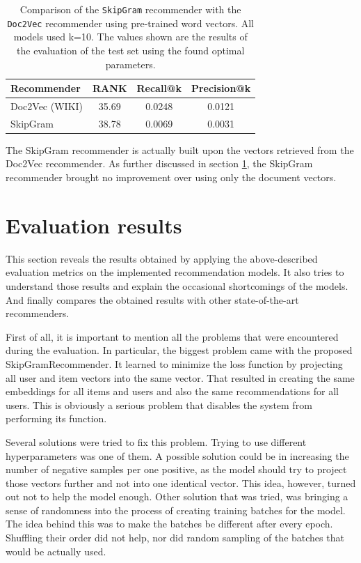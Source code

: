 \begin{table}[H]
    \centering
    \begin{tabular}{| l | c | c | c |}
        \hline
        Recommender & \textbf{RANK} & \textbf{Recall@k} & \textbf{Precision@k} \\ \hline
        Doc2Vec (WIKI)    &   35.69   &   0.0248  &   0.0121    \\ \hline
        SkipGram          & 38.78     &   0.0069  &   0.0031       \\ \hline
    \end{tabular}
    \caption{Comparison of the \texttt{SkipGram} recommender with the \texttt{Doc2Vec} recommender using pre-trained word vectors. All models used k=10. The values shown are the results of the evaluation of the test set using the found optimal parameters.}
    \label{doc2vec_skipgram}
\end{table}
The SkipGram recommender is actually built upon the vectors retrieved from the Doc2Vec recommender. As further discussed in section \ref{eval_results}, the SkipGram recommender brought no improvement over using only the document vectors.

\pagebreak

\section{Evaluation results} \label{eval_results}
This section reveals the results obtained by applying the above-described evaluation metrics on the implemented recommendation models. It also tries to understand those results and explain the occasional shortcomings of the models. And finally compares the obtained results with other state-of-the-art recommenders.

First of all, it is important to mention all the problems that were encountered during the evaluation. In particular, the biggest problem came with the proposed SkipGramRecommender. It learned to minimize the loss function by projecting all user and item vectors into the same vector. That resulted in creating the same embeddings for all items and users and also the same recommendations for all users. This is obviously a serious problem that disables the system from performing its function.

Several solutions were tried to fix this problem. Trying to use different hyperparameters was one of them. A possible solution could be in increasing the number of negative samples per one positive, as the model should try to project those vectors further and not into one identical vector. This idea, however, turned out not to help the model enough. Other solution that was tried, was bringing a sense of randomness into the process of creating training batches for the model. The idea behind this was to make the batches be different after every epoch. Shuffling their order did not help, nor did random sampling of the batches that would be actually used.

